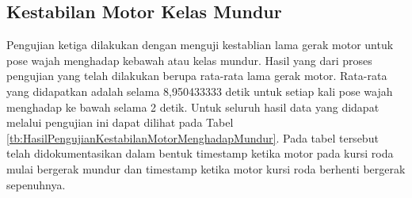 \subsection{Kestabilan Motor Kelas Mundur}
Pengujian ketiga dilakukan dengan menguji kestablian lama gerak motor untuk pose wajah menghadap kebawah atau kelas mundur. Hasil yang dari proses pengujian yang telah dilakukan berupa rata-rata lama gerak motor. Rata-rata yang didapatkan adalah selama 8,950433333 detik untuk setiap kali pose wajah menghadap ke bawah selama 2 detik. Untuk seluruh hasil data yang didapat melalui pengujian ini dapat dilihat pada Tabel \ref{tb:HasilPengujianKestabilanMotorMenghadapMundur}. Pada tabel tersebut telah didokumentasikan dalam bentuk timestamp ketika motor pada kursi roda mulai bergerak mundur dan timestamp ketika motor kursi roda berhenti bergerak sepenuhnya.

